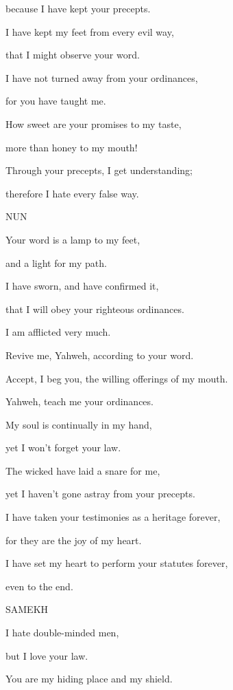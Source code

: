 {\par }{\QB because I have kept your precepts.
\par }{\Q {}I have kept my feet from every evil way,
\par }{\QB that I might observe your word.
\par }{\Q {}I have not turned away from your ordinances,
\par }{\QB for you have taught me.
\par }{\Q {}How sweet are your promises to my taste,
\par }{\QB more than honey to my mouth!
\par }{\Q {}Through your precepts, I get understanding;
\par }{\QB therefore I hate every false way.
\par }{\D NUN
\par }{\Q {}Your word is a lamp to my feet,
\par }{\QB and a light for my path.
\par }{\Q {}I have sworn, and have confirmed it,
\par }{\QB that I will obey your righteous ordinances.
\par }{\Q {}I am afflicted very much.
\par }{\QB Revive me, Yahweh, according to your word.
\par }{\Q {}Accept, I beg you, the willing offerings of my mouth.
\par }{\QB Yahweh, teach me your ordinances.
\par }{\Q {}My soul is continually in my hand,
\par }{\QB yet I won’t forget your law.
\par }{\Q {}The wicked have laid a snare for me,
\par }{\QB yet I haven’t gone astray from your precepts.
\par }{\Q {}I have taken your testimonies as a heritage forever,
\par }{\QB for they are the joy of my heart.
\par }{\Q {}I have set my heart to perform your statutes forever,
\par }{\QB even to the end.
\par }{\D SAMEKH
\par }{\Q {}I hate double-minded men,
\par }{\QB but I love your law.
\par }{\Q {}You are my hiding place and my shield.
}
